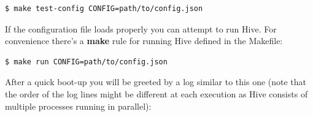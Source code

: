 \documentclass[a4paper]{article}
\begin{document}
\begin{verbatim}
$ make test-config CONFIG=path/to/config.json
\end{verbatim}



\noindent
If the configuration file loads properly you can attempt to run Hive. For convenience there's a \textbf{make} rule for running Hive defined in the Makefile:


\begin{verbatim}
$ make run CONFIG=path/to/config.json
\end{verbatim}



\noindent
After a quick boot-up you will be greeted by a log similar to this one (note that the order of the log lines might be different at each execution as Hive consists of multiple processes running in parallel):
\end{document}
